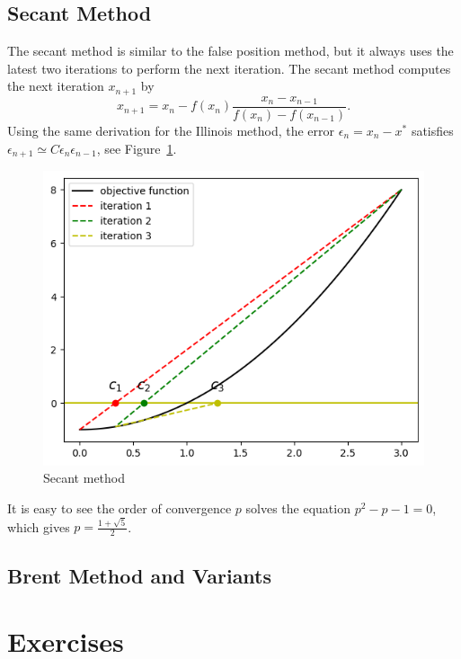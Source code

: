 \subsection{Secant Method}
\label{SSec: 0-SE-ME}
The secant method is similar to the false position method, but it always uses the latest two iterations to perform the next iteration. The secant method computes the next iteration $x_{n+1}$ by
$$
x_{n+1} = x_n - f(x_n)\frac{x_n - x_{n-1}}{f(x_n) - f(x_{n-1})}.
$$
Using the same derivation for the Illinois method, the error $\epsilon_{n} = x_n - x^{\ast}$ satisfies $\epsilon_{n+1} \simeq C \epsilon_{n}\epsilon_{n-1}$, see Figure~\ref{FIG: 0-RO-FI-SE}.
\begin{figure}[!htb]
    \centering
    \includegraphics[scale=0.6]{Figures/root_finding_img_3.png}
    \caption{Secant method}
    \label{FIG: 0-RO-FI-SE}
\end{figure}
It is easy to see the order of convergence $p$ solves the equation $p^2 - p - 1 = 0$, which gives $p = \frac{1 + \sqrt{5}}{2}$.
\subsection{Brent Method and Variants}

\section{Exercises}
